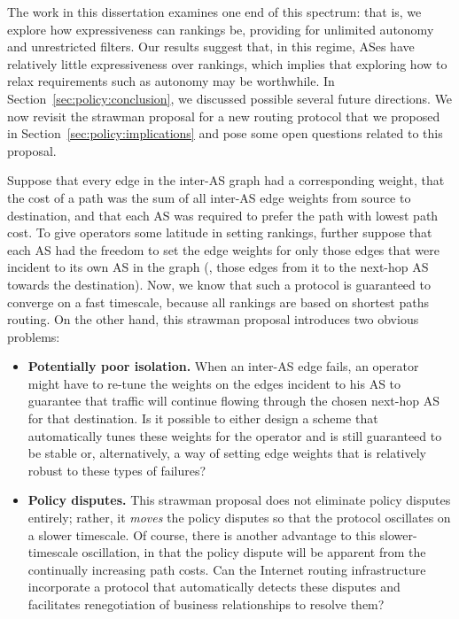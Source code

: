 The work in this dissertation examines one end of this spectrum: that
is, we explore how expressiveness can rankings be, providing for
unlimited autonomy 
and unrestricted filters.  Our results suggest that, in this regime,
ASes have relatively little expressiveness over rankings, which implies
that exploring how to relax requirements such as autonomy may be
worthwhile.  In Section~\ref{sec:policy:conclusion}, we discussed
possible several future directions.  We now revisit the strawman
proposal for a new routing protocol that we proposed in
Section~\ref{sec:policy:implications} and pose some open questions
related to this proposal. 

Suppose that every edge in the inter-AS graph had a corresponding
weight, that the cost of a path was the sum of all inter-AS edge weights
from source to destination, and that each AS was required to prefer the
path with lowest path cost.  To give operators some
latitude in setting rankings, further suppose that each AS had the
freedom to set the edge weights for only those edges that were incident
to its own AS in the graph (\ie, those edges from it to the next-hop AS
towards the destination).   Now, we know that such a protocol is
guaranteed to converge on a fast timescale, because all rankings are based
on shortest paths routing.  On the other hand, this strawman proposal
introduces two obvious problems:

\begin{itemize}
\itemsep=-1pt
\item {\bf Potentially poor isolation.} When an inter-AS edge fails, an
operator might 
have to re-tune the weights on the edges incident to his AS to guarantee
that traffic will continue flowing through the chosen next-hop AS for
that destination.  Is it possible to either design a scheme that
automatically tunes these weights for the operator and is still
guaranteed to be stable or, alternatively, a way of setting edge weights
that is relatively robust to these types of failures?
\item {\bf Policy disputes.} This strawman proposal does not eliminate
policy disputes entirely; rather, it {\em moves} the policy disputes so
that the protocol oscillates on a slower timescale.  Of course, there is
another advantage to this 
slower-timescale oscillation, in that the policy dispute will be
apparent from the continually increasing path costs.  Can the Internet
routing infrastructure incorporate a protocol that automatically detects
these disputes and facilitates renegotiation of business relationships
to resolve them?
\end{itemize}




